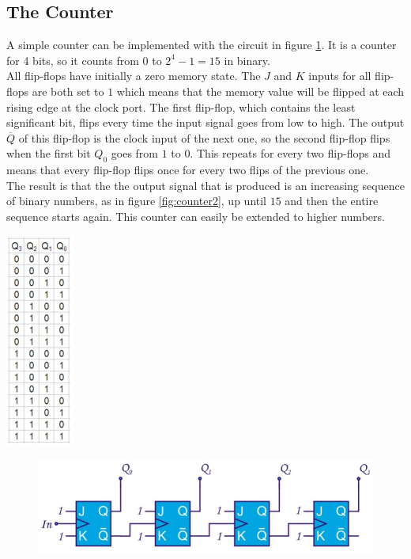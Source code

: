 \subsection{The Counter}

\begin{minipage}{.7\textwidth}
	A simple counter can be implemented with the circuit in figure \ref{fig:counter1}. It is a counter for 4 bits, so it counts from $0$ to $2^4 - 1 = 15$ in binary.\\
	All flip-flops have initially a zero memory state. The $J$ and $K$ inputs for all flip-flops are both set to $1$ which means that the memory value will be flipped at each rising edge at the clock port. The first flip-flop, which contains the least significant bit, flips every time the input signal goes from low to high. The output $\overline{Q}$ of this flip-flop is the clock input of the next one, so the second flip-flop flips when the first bit $Q_0$ goes from $1$ to $0$. This repeats for every two flip-flops and means that every flip-flop flips once for every two flips of the previous one.\\
	The result is that the the output signal that is produced is an increasing sequence of binary numbers, as in figure \ref{fig:counter2}, up until $15$ and then the entire sequence starts again. This counter can easily be extended to higher numbers.
\end{minipage}
\begin{minipage}{.3\textwidth}
	\centering
	\includegraphics[height=7cm]{figures/ch17/counter2.jpg}
	\label{fig:counter2}
\end{minipage}%

\begin{figure}[h!]
	\centering
	\includegraphics[width=12cm]{figures/ch17/counter1.jpg}
	\caption{}
	\label{fig:counter1}
\end{figure}

